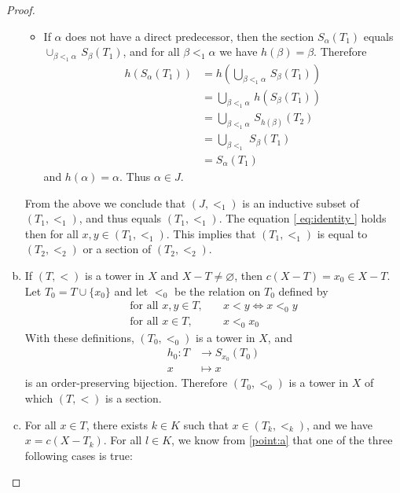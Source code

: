 \documentclass[11pt,a4paper,twoside]{article}
\theoremstyle{definition}
\theoremstyle{plain}
\begin{document}
\begin{proof}
\begin{enumerate}[(a)]
\begin{itemize}
    \item If $\alpha$ does not have a direct predecessor, then
      the section $S_\alpha ( T_1 )$ equals $\cup_{ \beta <_1 \alpha } \, S_\beta ( T_1 )$, and for all
      $\beta <_1 \alpha$ we have $h ( \beta ) = \beta$. Therefore
      \begin{align*}
        h \left( S_\alpha \left( T_1 \right) \right) &= h \left( \bigcup_{ \beta <_1 \alpha } \, S_\beta ( T_1 ) \right) \\
        &= \bigcup_{ \beta <_1 \alpha } \, h \left( S_\beta ( T_1 ) \right) \\
        &= \bigcup_{ \beta <_1 \alpha } \, S_{ h ( \beta ) } ( T_2 ) \\
        &= \bigcup_{ \beta <_1 } \, S_\beta ( T_1 ) \\
        &= S_\alpha ( T_1 )
      \end{align*}
      and $h ( \alpha ) = \alpha$. Thus $\alpha \in J$.

    \end{itemize}

    From the above we conclude that $( J, <_1 )$ is an inductive subset of $( T_1, <_1 )$, and
    thus equals $( T_1, <_1 )$. The equation \eqref{ eq:identity } holds then for all $x, y \in ( T_1, <_1 )$.
    This implies that $( T_1, <_1 )$ is equal to $( T_2, <_2 )$ or a section of $( T_2, <_2 )$.

  \item\label{point:b} If $( T, < )$ is a tower in $X$ and $X - T \neq \varnothing$, then
    $c ( X - T ) = x_0 \in X - T$. Let $T_0 = T \cup \{ x_0 \}$ and let $<_0$ be the relation on $T_0$
    defined by
    \begin{align*}
      \text{for all } x, y \in T, &\quad x < y \iff x <_0 y \\
      \text{for all } x \in T, &\quad x <_0 x_0
    \end{align*}
    With these definitions, $( T_0, <_0 )$ is a tower in $X$, and
    \begin{align*}
      h_0 \colon T &\to S_{ x_0 } ( T_0 ) \\
      x &\mapsto x
    \end{align*}
    is an order-preserving bijection. Therefore $( T_0, <_0 )$ is a tower in $X$ of which $( T, < )$
    is a section.

  \item For all $x \in T$, there exists $k \in K$ such that $x \in ( T_k, <_k )$, and we have $x = c ( X - T_k )$.
    For all $l \in K$, we know from \cref{point:a} that one of the three following cases is true:
    \begin{itemize}


\end{itemize}
\end{enumerate}
\end{proof}
\end{document}
